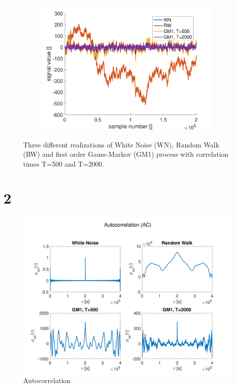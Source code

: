 \documentclass{article}
\begin{document}
\begin{figure}[H]
\begin{subfigure}[t]{0.49\textwidth}
\end{subfigure}
~
\begin{subfigure}[t]{0.49\textwidth}
\centering
\includegraphics[width=\textwidth]{signal3}
\end{subfigure}
\caption{Three different realizations of White Noise (WN), Random Walk (RW) and first order Gauss-Markov (GM1) process with correlation times T=500 and T=2000.}
\label{fig:signals}
\end{figure}

\section*{2 }


\begin{figure}[H]
    \centering
    \includegraphics[width=\textwidth]{ac}
    \caption{Autocorrelation}
    \label{fig:autocorr}
\end{figure}
\end{document}
